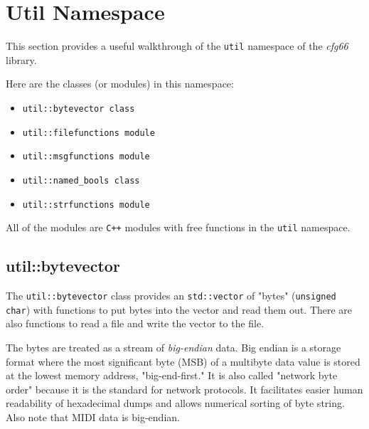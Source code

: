 %
%
%

\section{Util Namespace}
\label{sec:util_namespace}

   This section provides a useful walkthrough of the \texttt{util} namespace of
   the \textsl{cfg66} library.

   Here are the classes (or modules) in this namespace:

   \begin{itemize}
      \item \texttt{util::bytevector class}
      \item \texttt{util::filefunctions module}
      \item \texttt{util::msgfunctions module}
      \item \texttt{util::named\_bools class}
      \item \texttt{util::strfunctions module}
   \end{itemize}

   All of the modules are \texttt{C++} modules with free functions
   in the \texttt{util} namespace.

\subsection{util::bytevector}
\label{subsec:util_namespace_bytevector}

   The \texttt{util::bytevector} class
   provides an \texttt{std::vector} of "bytes" (\texttt{unsigned char}) with
   functions to put bytes into the vector and read them out.
   There are also functions to read a file and write the vector to the
   file.

   The bytes are treated as a stream of \textsl{big-endian} data.
   Big endian is a storage format where the most significant
   byte (MSB) of a multibyte data value is stored at the lowest memory address,
   "big-end-first." It is also called "network byte order" because it is the
   standard for network protocols. It facilitates easier human readability of
   hexadecimal dumps and allows numerical sorting of byte string.
   Also note that MIDI data is big-endian.

